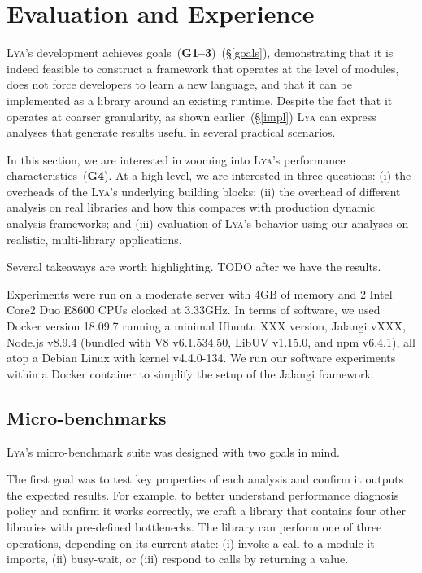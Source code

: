 \documentclass[letterpaper,twocolumn,10pt]{article}
\newcommand{\sx}[1]{(\S\ref{#1})}
\newcommand{\sys}{{\scshape Lya}\xspace}
\newcommand{\goal}[1]{(\textbf{G#1})\xspace}
\newcommand{\fixme}[1]{{\color{red}#1}}
\begin{document}
\section{Evaluation and Experience}
\label{eval}

\sys's  development achieves goals~\goal{1--3}~\sx{goals}, demonstrating that it is indeed feasible to construct a framework that operates at the level of modules, 
does not force developers to learn a new language, and that it can be implemented as a library around an existing runtime.
Despite the fact that it operates at coarser granularity, as shown earlier~\sx{impl} \sys can express analyses that generate results useful in several practical scenarios.

In this section, we are interested in zooming into \sys's performance characteristics~\goal{4}.
At a high level, we are interested in three questions:
(i) the overheads of the \sys's underlying building blocks;
(ii) the overhead of different analysis on real libraries and how this compares with production dynamic analysis frameworks; and
(iii) evaluation of \sys's behavior using our analyses on realistic, multi-library applications.

Several takeaways are worth highlighting.
\fixme{TODO after we have the results.}

Experiments were run on a moderate server with 4GB of memory and 2 Intel Core2 Duo E8600 CPUs clocked at 3.33GHz.
In terms of software, we used Docker version 18.09.7 running \fixme{a minimal Ubuntu XXX version}, Jalangi \fixme{vXXX}, Node.js v8.9.4 (bundled with V8 v6.1.534.50, LibUV v1.15.0, and npm v6.4.1), all atop a Debian Linux with kernel v4.4.0-134.
We run our software experiments within a Docker container to simplify the setup of the Jalangi framework.

\subsection{Micro-benchmarks}
\label{micro}

\sys's micro-benchmark suite was designed with two goals in mind.

The first goal was to test key properties of each analysis and confirm it outputs the expected results.
For example, to better understand performance diagnosis policy and confirm it works correctly, we craft a library that contains four other libraries with pre-defined bottlenecks.
The library can perform one of three operations, depending on its current state:
  (i) invoke a call to a module it imports,
  (ii) busy-wait, or
  (iii) respond to calls by returning a value.
\end{document}

